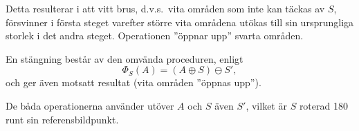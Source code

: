 \documentclass[../rapport_MVEX01-11-05]{subfiles}
\begin{document}
Detta resulterar i att vitt brus, d.v.s.~vita områden som inte kan täckas
av $S$, försvinner i
första steget varefter större vita områdena utökas till sin ursprungliga
storlek i det andra
steget. Operationen ''öppnar upp'' svarta områden.

En stängning består av den omvända proceduren, enligt
\begin{equation*}
  \Phi_S(A)=(A\oplus S)\ominus S',
\end{equation*}
och ger även motsatt resultat (vita områden ''öppnas upp'').

De
båda operationerna använder utöver $A$ och $S$ även $S'$, vilket är
$S$ roterad 180\textdegree{} runt sin referensbildpunkt.
\end{document}
